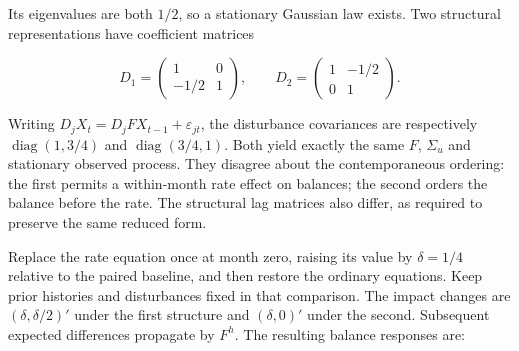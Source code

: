 Its eigenvalues are both \(1/2\), so a stationary Gaussian law exists.
Two structural representations have coefficient matrices

\[
 D_1=\begin{pmatrix}1&0\\-1/2&1\end{pmatrix},\qquad
 D_2=\begin{pmatrix}1&-1/2\\0&1\end{pmatrix}.
\]

Writing \(D_jX_t=D_jFX_{t-1}+\varepsilon_{jt}\), the disturbance
covariances are respectively \(\operatorname{diag}(1,3/4)\) and
\(\operatorname{diag}(3/4,1)\). Both yield exactly the same \(F\),
\(\Sigma_u\) and stationary observed process. They disagree about the
contemporaneous ordering: the first permits a within-month rate effect
on balances; the second orders the balance before the rate. The
structural lag matrices also differ, as required to preserve the same
reduced form.

Replace the rate equation once at month zero, raising its value by
\(\delta=1/4\) relative to the paired baseline, and then restore the
ordinary equations. Keep prior histories and disturbances fixed in that
comparison. The impact changes are \((\delta,\delta/2)'\) under the
first structure and \((\delta,0)'\) under the second. Subsequent
expected differences propagate by \(F^h\). The resulting balance
responses are:

